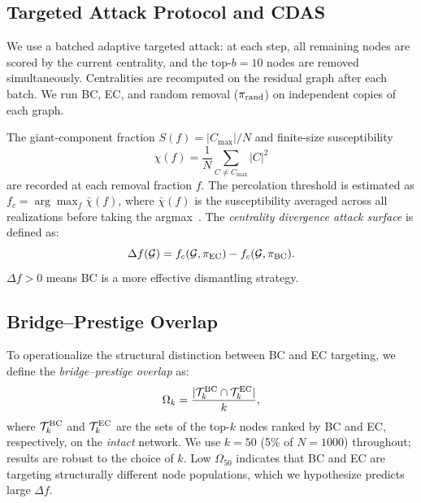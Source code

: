 \documentclass[journal]{IEEEtran}
\begin{document}
\subsection{Targeted Attack Protocol and CDAS}

We use a batched adaptive targeted attack: at each step, all remaining
nodes are scored by the current centrality, and the top-$b = 10$ nodes
are removed simultaneously.
Centralities are recomputed on the residual graph after each batch.
We run BC, EC, and random removal ($\pi_{\rm rand}$) on independent copies
of each graph.

The giant-component fraction $S(f) = |C_{\max}| / N$ and finite-size
susceptibility
\begin{equation}
  \chi(f) = \frac{1}{N} \sum_{C \neq C_{\max}} |C|^2
  \label{eq:chi}
\end{equation}
are recorded at each removal fraction $f$.
The percolation threshold is estimated as
$f_c = \arg\max_f \bar{\chi}(f)$,
where $\bar{\chi}(f)$ is the susceptibility averaged across all realizations
before taking the argmax~\cite{newman2001random}.
The \emph{centrality divergence attack surface} is defined as:
\begin{equation}
  \Delta f(\mathcal{G}) = f_c(\mathcal{G}, \pi_{\rm EC})
                        - f_c(\mathcal{G}, \pi_{\rm BC}).
  \label{eq:cdas}
\end{equation}
$\Delta f > 0$ means BC is a more effective dismantling strategy.

\subsection{Bridge--Prestige Overlap}

To operationalize the structural distinction between BC and EC targeting, we
define the \emph{bridge--prestige overlap} as:
\begin{equation}
  \Omega_k = \frac{|\mathcal{T}_k^{\rm BC} \cap \mathcal{T}_k^{\rm EC}|}{k},
  \label{eq:overlap}
\end{equation}
where $\mathcal{T}_k^{\rm BC}$ and $\mathcal{T}_k^{\rm EC}$ are the sets of the
top-$k$ nodes ranked by BC and EC, respectively, on the \emph{intact} network.
We use $k = 50$ (5\% of $N = 1000$) throughout; results are robust to the
choice of $k$.
Low $\Omega_{50}$ indicates that BC and EC are targeting structurally different
node populations, which we hypothesize predicts large $\Delta f$.

\end{document}
